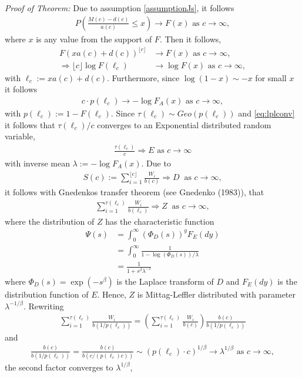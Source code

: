 \documentclass[]{elsarticle} %
\begin{document}
\emph{Proof of Theorem:} Due to assumption \eqref{assumptionJs}, it
follows \begin{align*}
    P\left(\frac{M(c)-d(c)}{a(c)} \leq x\right) \rightarrow F(x) \text{ as } c \rightarrow \infty,
    \end{align*} where \(x\) is any value from the support of \(F\).
Then it follows, \begin{align*}
      F(xa(c)+d(c))^{\lfloor c \rfloor} &\rightarrow F(x) \text{ as } c \rightarrow \infty,\\
      \Rightarrow  \lfloor c \rfloor \log F(\ell_c)  &\rightarrow \log F(x)\text{ as } c \rightarrow \infty,
    \end{align*} with \(\ell_c:=xa(c)+d(c)\). Furthermore, since
\(\log(1-x) \sim -x\) for small \(x\) it follows \begin{align}
      c \cdot p(\ell_c) \rightarrow -\log F_A(x)  \text{ as } c \rightarrow \infty,\label{eq:lplconv}
    \end{align} with \(p(\ell_c):= 1-F(\ell_c)\). Since
\(\tau(\ell_c) \sim Geo(p(\ell_c))\) and \eqref{eq:lplconv} it follows
that \(\tau(\ell_c)/c\) converges to an Exponential distributed random
variable, \begin{align*}
    \frac{\tau(\ell_c)}{c} \Rightarrow E  \text{ as } c \rightarrow \infty
    \end{align*} with inverse mean \(\lambda:=-\log F_A(x)\). Due to
\begin{align*}
    S(c):= \sum_{i=1}^{\lfloor c \rfloor} \frac{W_i}{b(c)} \Rightarrow D \ \text{ as } c \rightarrow \infty,
    \end{align*} it follows with Gnedenkos transfer theorem (see
Gnedenko (1983)), that \begin{align}
    \sum_{i=1}^{ \tau(\ell_c)} \frac{W_i}{b(\ell_c)}  \Rightarrow Z\ \text{ as }  c \rightarrow \infty, \label{TheoGutArg}
    \end{align} where the distribution of \(Z\) has the characteristic
function \begin{align}
    \Psi(s) &= \int_0^{\infty} (\Phi_D(s))^{y} F_E(dy) \nonumber\\
    &= \int_0^{\infty} \frac{1}{1-\log(\Phi_D(s))/\lambda} \nonumber\\
    &= \frac{1}{1+s^{\beta}\lambda^{-1}}
    \end{align} where \(\Phi_D(s) = \exp(-s^\beta)\) is the Laplace
transform of \(D\) and \(F_E(dy)\) is the distribution function of
\(E\). Hence, \(Z\) is Mittag-Leffler distributed with parameter
\(\lambda^{-1/\beta}\). Rewriting \begin{align*}
    \sum_{i=1}^{ \tau(\ell_c)} \frac{W_i}{b(1/p(\ell_c))} = \left(\sum_{i=1}^{ \tau(\ell_c)} \frac{W_i}{b(c) }\right) \frac{b(c)}{b(1/p(\ell_c))}  
    \end{align*} and \begin{align*}
    \frac{b(c)}{b(1/p(\ell_c))} = \frac{b(c)}{b(c/(p(\ell_c)c))} \sim (p(\ell_c) \cdot c)^{1/\beta} \rightarrow \lambda^{1/\beta} \text{ as } c \rightarrow \infty,
    \end{align*} the second factor converges to \(\lambda^{1/\beta}\),
\end{document}
